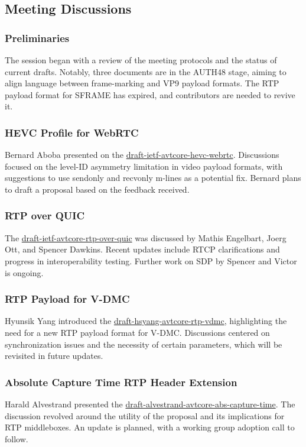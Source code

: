\documentclass{article}
\begin{document}
\subsection{Meeting Discussions}

\subsubsection{Preliminaries}
The session began with a review of the meeting protocols and the status of current drafts. Notably, three documents are in the AUTH48 stage, aiming to align language between frame-marking and VP9 payload formats. The RTP payload format for SFRAME has expired, and contributors are needed to revive it.

\subsubsection{HEVC Profile for WebRTC}
Bernard Aboba presented on the \href{https://datatracker.ietf.org/doc/html/draft-ietf-avtcore-hevc-webrtc}{draft-ietf-avtcore-hevc-webrtc}. Discussions focused on the level-ID asymmetry limitation in video payload formats, with suggestions to use sendonly and recvonly m-lines as a potential fix. Bernard plans to draft a proposal based on the feedback received.

\subsubsection{RTP over QUIC}
The \href{https://datatracker.ietf.org/doc/html/draft-ietf-avtcore-rtp-over-quic}{draft-ietf-avtcore-rtp-over-quic} was discussed by Mathis Engelbart, Joerg Ott, and Spencer Dawkins. Recent updates include RTCP clarifications and progress in interoperability testing. Further work on SDP by Spencer and Victor is ongoing.

\subsubsection{RTP Payload for V-DMC}
Hyunsik Yang introduced the \href{https://datatracker.ietf.org/doc/html/draft-hsyang-avtcore-rtp-vdmc}{draft-hsyang-avtcore-rtp-vdmc}, highlighting the need for a new RTP payload format for V-DMC. Discussions centered on synchronization issues and the necessity of certain parameters, which will be revisited in future updates.

\subsubsection{Absolute Capture Time RTP Header Extension}
Harald Alvestrand presented the \href{https://datatracker.ietf.org/doc/html/draft-alvestrand-avtcore-abs-capture-time}{draft-alvestrand-avtcore-abs-capture-time}. The discussion revolved around the utility of the proposal and its implications for RTP middleboxes. An update is planned, with a working group adoption call to follow.
\end{document}
